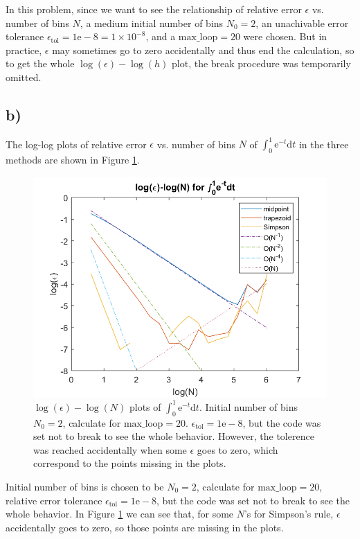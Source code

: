 \documentclass[12pt, graphicx]{article}
\begin{document}
In this problem, since we want to see the relationship of relative error $\epsilon$ vs. number of bins $N$, a medium initial number of bins $N_0=2$, an unachivable error tolerance $\epsilon_\mathrm{tol}=1\mathrm{e}-8=1\times10^{-8}$, and a $\mathrm{max\_loop}=20$ were chosen. But in practice, $\epsilon$ may sometimes go to zero accidentally and thus end the calculation, so to get the whole $\log(\epsilon)-\log(h)$ plot, the break procedure was temporarily omitted.

\subsection*{b)}
The log-log plots of relative error $\epsilon$ vs. number of bins $N$ of $\int_0^1\mathrm{e}^{-t}\mathrm{d}t$ in the three methods are shown in Figure \ref{fig:int_exp_10}.

\begin{figure}[ht]
\centering
\includegraphics[width = 120mm]{int_exp-x.png}
\caption{$\log(\epsilon)-\log(N)$ plots of $\int_0^1\mathrm{e}^{-t}\mathrm{d}t$. Initial number of bins $N_0=2$, calculate for $\mathrm{max\_loop}=20$. $\epsilon_\mathrm{tol}=1\mathrm{e}-8$, but the code was set not to break to see the whole behavior. However, the tolerence was reached accidentally when some $\epsilon$ goes to zero, which correspond to the points missing in the plots.}
\label{fig:int_exp_10}
\end{figure}

Initial number of bins is chosen to be $N_0=2$, calculate for $\mathrm{max\_loop}=20$, relative error tolerance $\epsilon_\mathrm{tol}=1\mathrm{e}-8$, but the code was set not to break to see the whole behavior. In Figure \ref{fig:int_exp_10} we can see that, for some $N$'s for Simpson's rule, $\epsilon$ accidentally goes to zero, so those points are missing in the plots.\par
\end{document}
